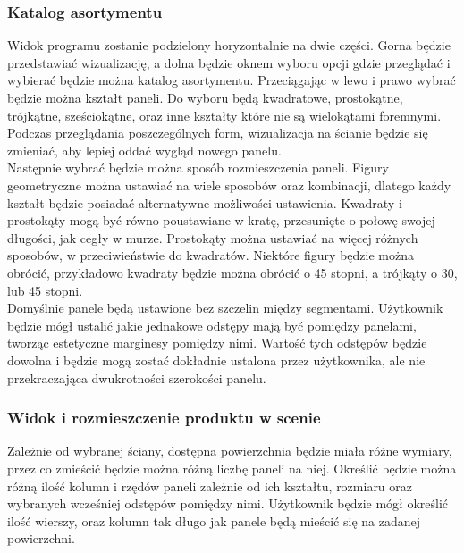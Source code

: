 \documentclass{article} %
\begin{document}
        \subsubsection{Katalog asortymentu}
        Widok programu zostanie podzielony horyzontalnie na dwie części. Gorna będzie przedstawiać wizualizację, a dolna będzie oknem wyboru opcji gdzie przeglądać i wybierać będzie można katalog asortymentu. Przeciągając w lewo i prawo wybrać będzie można kształt paneli. Do wyboru będą kwadratowe, prostokątne, trójkątne, sześciokątne, oraz inne kształty które nie są wielokątami foremnymi. Podczas przeglądania poszczególnych form, wizualizacja na ścianie będzie się zmieniać, aby lepiej oddać wygląd nowego panelu.
        \\
        
        Następnie wybrać będzie można sposób rozmieszczenia paneli. Figury geometryczne można ustawiać na wiele sposobów oraz kombinacji, dlatego każdy kształt będzie posiadać alternatywne możliwości ustawienia. Kwadraty i prostokąty mogą być równo poustawiane w kratę, przesunięte o połowę swojej długości, jak cegły w murze. Prostokąty można ustawiać na więcej różnych sposobów, w przeciwieństwie do kwadratów. Niektóre figury będzie można obrócić, przykładowo kwadraty będzie można obrócić o 45 stopni, a trójkąty o 30, lub 45 stopni.
        \\
        
        Domyślnie panele będą ustawione bez szczelin między segmentami. Użytkownik będzie mógł ustalić jakie jednakowe odstępy mają być pomiędzy panelami, tworząc estetyczne marginesy pomiędzy nimi. Wartość tych odstępów będzie dowolna i będzie mogą zostać dokładnie ustalona przez użytkownika, ale nie przekraczająca dwukrotności szerokości panelu.
        \\
        
        \subsubsection{Widok i rozmieszczenie produktu w scenie}
        Zależnie od wybranej ściany, dostępna powierzchnia będzie miała różne wymiary, przez co zmieścić będzie można różną liczbę paneli na niej. Określić będzie można różną ilość kolumn i rzędów paneli zależnie od ich kształtu, rozmiaru oraz wybranych wcześniej odstępów pomiędzy nimi. Użytkownik będzie mógł określić ilość wierszy, oraz kolumn tak długo jak panele będą mieścić się na zadanej powierzchni.
        \\
        
\end{document}
